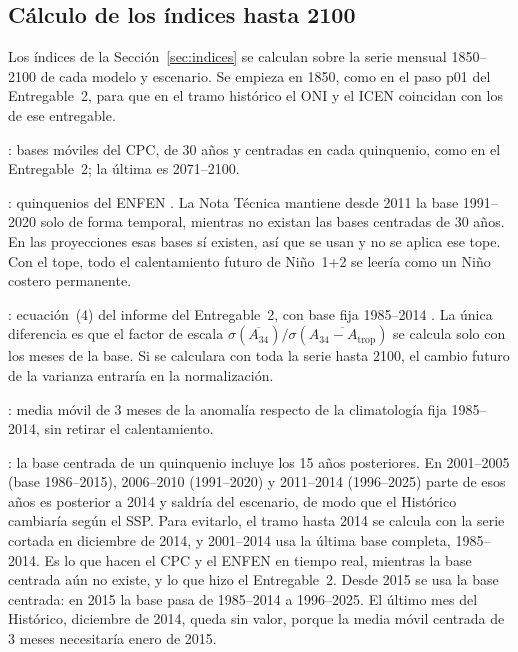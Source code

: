 \documentclass[11pt,a4paper]{article}
\begin{document}
\subsection{Cálculo de los índices hasta 2100}
\label{sec:a_indices_calculo}

Los índices de la Sección~\ref{sec:indices} se calculan sobre la serie mensual 1850--2100 de cada modelo y escenario.
Se empieza en 1850, como en el paso p01 del Entregable~2, para que en el tramo histórico el ONI y el ICEN coincidan con los de ese entregable.

: bases móviles del CPC, de 30 años y centradas en cada quinquenio, como en el Entregable~2; la última es 2071--2100.

: quinquenios del ENFEN \citep{enfen2024}.
La Nota Técnica mantiene desde 2011 la base 1991--2020 solo de forma temporal, mientras no existan las bases centradas de 30 años.
En las proyecciones esas bases sí existen, así que se usan y no se aplica ese tope.
Con el tope, todo el calentamiento futuro de Niño~1+2 se leería como un Niño costero permanente.

: ecuación~(4) del informe del Entregable~2, con base fija 1985--2014 \citep{vanoldenborgh2021}.
La única diferencia es que el factor de escala $\sigma(\overline{A_{34}})/\sigma(\overline{A_{34}-A_{\mathrm{trop}}})$ se calcula solo con los meses de la base.
Si se calculara con toda la serie hasta 2100, el cambio futuro de la varianza entraría en la normalización.

: media móvil de 3 meses de la anomalía respecto de la climatología fija 1985--2014, sin retirar el calentamiento.

: la base centrada de un quinquenio incluye los 15 años posteriores.
En 2001--2005 (base 1986--2015), 2006--2010 (1991--2020) y 2011--2014 (1996--2025) parte de esos años es posterior a 2014 y saldría del escenario, de modo que el Histórico cambiaría según el SSP.
Para evitarlo, el tramo hasta 2014 se calcula con la serie cortada en diciembre de 2014, y 2001--2014 usa la última base completa, 1985--2014.
Es lo que hacen el CPC y el ENFEN en tiempo real, mientras la base centrada aún no existe, y lo que hizo el Entregable~2.
Desde 2015 se usa la base centrada: en 2015 la base pasa de 1985--2014 a 1996--2025.
El último mes del Histórico, diciembre de 2014, queda sin valor, porque la media móvil centrada de 3 meses necesitaría enero de 2015.
\end{document}

